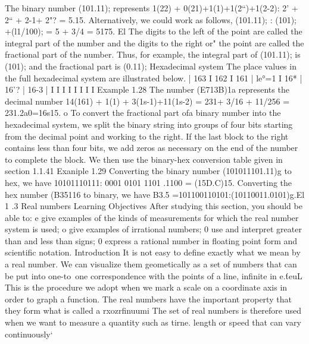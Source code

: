 
The binary number (101.11); represents
1(22) + 0(21)+1(1)+1(2“)+1(2-2): 2’ + 2“ + 2-1+ 2"? = 5.15.
Alternatively, we could work as follows,
(101.11); : (101); +(l1/100); = 5 + 3/4 = 5175. El
The digits to the left of the point are called the integral part of the number and the digits to the
right or" the point are called the fractional part of the number. Thus, for example, the integral
part of (101.11); is (101); and the fractional part is (0.11);
Hexadecimal system
The place values in the full hexadecimal system are illustrated below.
 | 163 I 162 I 161 | le°=1 I 16* | 16'? | 16-3 | 
I I I I I I I I
Example 1.28 The number (E713B)1a represents the decimal number
14(161) + 1(1) + 3(1s-1)+11(1s-2) = 231+ 3/16 + 11/256 = 231.2a0=16s15. o
To convert the fractional part ofa binary number into the hexadecimal system, we split the binary
string into groups of four bits starting from the decimal point and working to the right. If the last
block to the right contains less than four bits, we add zeros as necessary on the end of the number
to complete the block. We then use the binary-hex conversion table given in section 1.1.41
Exaniple 1.29 Converting the binary number (101011101.11)g to hex, we have
10101110111: 0001 0101 1101 .1100 = (15D.C)15.
Converting the hex number (B35116 to binary, we have
B3.5 =101100110101:(10110011.0101)g.El
1 .3 Real numbers
Learning Objectives
After studying this section, you should be able to:
e give examples of the kinds of measurements for which the real number system is used;
o give examples of irrational numbers;
0 use and interpret greater than and less than signs;
0 express a rational number in ﬂoating point form and scientiﬁc notation.
Introduction
It is not easy to deﬁne exactly what we mean by a real number. We can visualize them geometically
as a set of numbers that can be put into one-to~one correspondence with the points of a line, inﬁnite
in e.\'teuL This is the procedure we adopt when we mark a scale on a coordinate axis in order to
graph a function. The real numbers have the important property that they form what is called a
rxozrfinuumi The set of real numbers is therefore used when we want to measure a quantity such as
tirne. length or speed that can vary continuously‘


